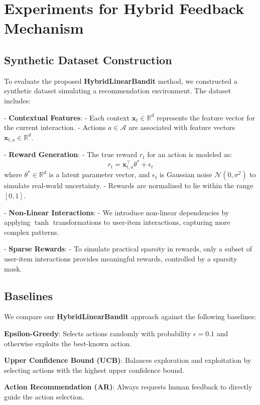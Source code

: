 \section{Experiments for Hybrid Feedback Mechanism}

\subsection{Synthetic Dataset Construction}

To evaluate the proposed \textbf{HybridLinearBandit} method, we constructed a synthetic dataset simulating a recommendation environment. The dataset includes:

- \textbf{Contextual Features}:
  - Each context \(\mathbf{x}_t \in \mathbb{R}^d\) represents the feature vector for the current interaction.
  - Actions \(a \in \mathcal{A}\) are associated with feature vectors \(\mathbf{x}_{t,a} \in \mathbb{R}^d\).

- \textbf{Reward Generation}:
  - The true reward \(r_t\) for an action is modeled as:
    \[
    r_t = \mathbf{x}_{t,a}^\top \theta^* + \epsilon_t
    \]
    where \(\theta^* \in \mathbb{R}^d\) is a latent parameter vector, and \(\epsilon_t\) is Gaussian noise \(\mathcal{N}(0, \sigma^2)\) to simulate real-world uncertainty.
  - Rewards are normalized to lie within the range \([0, 1]\).

- \textbf{Non-Linear Interactions}:
  - We introduce non-linear dependencies by applying \(\tanh\) transformations to user-item interactions, capturing more complex patterns.

- \textbf{Sparse Rewards}:
  - To simulate practical sparsity in rewards, only a subset of user-item interactions provides meaningful rewards, controlled by a sparsity mask.

\subsection{Baselines}

We compare our \textbf{HybridLinearBandit} approach against the following baselines:

\textbf{Epsilon-Greedy}:
  Selects actions randomly with probability \(\epsilon = 0.1\) and otherwise exploits the best-known action.

\textbf{Upper Confidence Bound (UCB)}:
  Balances exploration and exploitation by selecting actions with the highest upper confidence bound.

\textbf{Action Recommendation (AR)}:
  Always requests human feedback to directly guide the action selection.

